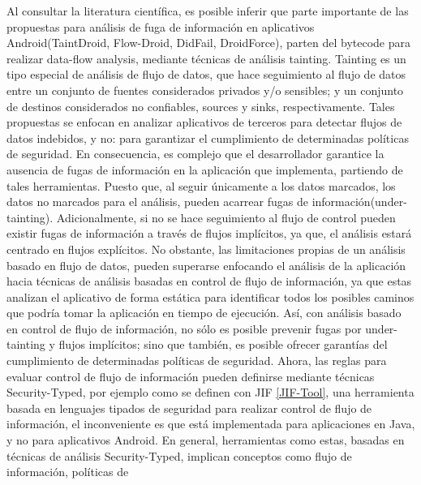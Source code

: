 Al consultar la literatura científica, es posible inferir que parte importante
de las propuestas para análisis de fuga de información en aplicativos
Android(TaintDroid\cite{TaintDroid}, Flow-Droid\cite{FlowDroid-Thesis},
DidFail\cite{DidFail}, DroidForce\cite{DroidForce}), parten del bytecode para
realizar data-flow analysis, mediante técnicas de análisis tainting. Tainting
es un tipo especial de análisis de flujo de datos, que hace seguimiento al flujo
de datos entre un conjunto de fuentes considerados privados y/o sensibles; y un
conjunto de destinos considerados no confiables, sources y sinks,
respectivamente.\newline 
Tales propuestas se enfocan en analizar aplicativos de terceros para detectar
flujos de datos indebidos, y no: para garantizar el cumplimiento de determinadas
políticas de seguridad. En consecuencia, es complejo que el desarrollador
garantice la ausencia de fugas de información en la aplicación que implementa,
partiendo de tales herramientas. Puesto que, al seguir únicamente a los datos
marcados, los datos no marcados para el análisis, pueden acarrear fugas de
información(under-tainting). Adicionalmente, si no se hace seguimiento al flujo
de control pueden existir fugas de información a través de flujos implícitos,
ya que, el análisis estará centrado en flujos explícitos.\newline
No obstante, las limitaciones propias de un análisis basado en flujo de datos,
pueden superarse enfocando el análisis de la aplicación hacia técnicas de
análisis basadas en control de flujo de información, ya que estas analizan el
aplicativo de forma estática para identificar todos los posibles caminos que
podría tomar la aplicación en tiempo de ejecución. Así, con análisis basado en
control de flujo de información, no sólo es posible prevenir fugas por
under-tainting y flujos implícitos; sino que también, es posible ofrecer
garantías del cumplimiento de determinadas políticas de seguridad.\newline 
Ahora, las reglas para evaluar control de flujo de información pueden definirse
mediante técnicas Security-Typed, por ejemplo como se definen con
JIF \ref{JIF-Tool}, una herramienta basada en lenguajes tipados de seguridad
para realizar control de flujo de información, el inconveniente es que está
implementada para aplicaciones en Java, y no para aplicativos Android.\newline 
En general, herramientas como estas, basadas en técnicas de análisis
Security-Typed, implican conceptos como flujo de información, políticas de
